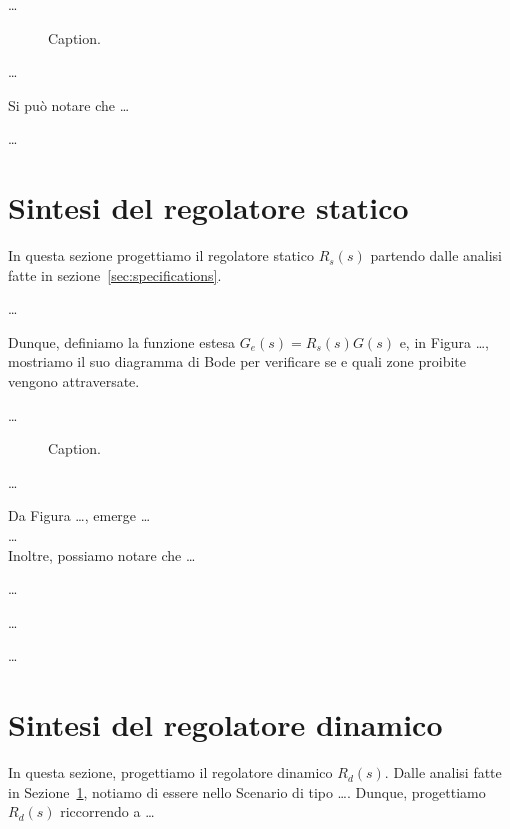 \documentclass[a4paper, 11pt]{article}
\begin{document}
\dots

\begin{figure}[h]
    \centering
    \caption{Caption.}
    \label{fig:bode_diagram}
\end{figure}

\dots

Si può notare che \dots

\dots

\section{Sintesi del regolatore statico}
\label{sec:static_regulator}

In questa sezione progettiamo il regolatore statico $R_s(s)$ partendo dalle analisi fatte in sezione~\ref{sec:specifications}.

\dots

Dunque, definiamo la funzione estesa $G_e(s) = R_s(s)G(s)$ e, in Figura \dots, mostriamo il suo diagramma di Bode per verificare se e quali zone proibite vengono attraversate.

\dots

\begin{figure}[h]
    \centering
    \caption{Caption.}
    \label{fig:bode_diagram}
\end{figure}

\dots
 
Da Figura \dots, emerge \dots\\

\dots\\

Inoltre, possiamo notare che \dots

\dots

\dots

\dots


\section{Sintesi del regolatore dinamico}

In questa sezione, progettiamo il regolatore dinamico $R_d(s)$. 
%
Dalle analisi fatte in Sezione~\ref{sec:static_regulator}, notiamo di essere nello Scenario di tipo \dots. Dunque, progettiamo $R_d(s)$ riccorrendo a \dots
\end{document}
